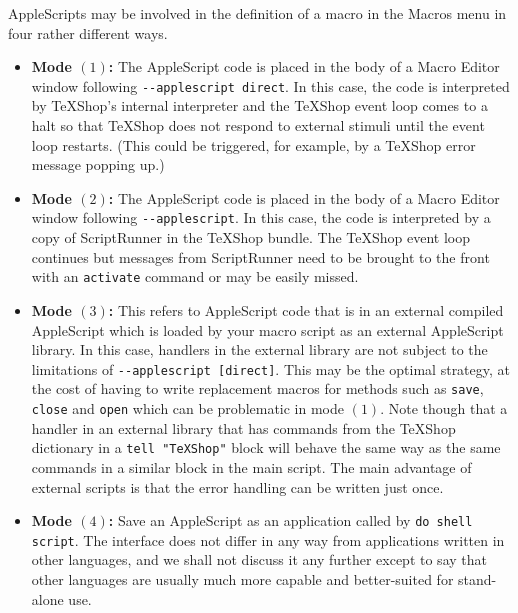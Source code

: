 \documentclass[11pt]{amsart}
\def\Macros{\textsf{Macros}\xspace}
\begin{document}
AppleScripts may be involved in the definition of a macro in the \Macros menu in four rather different ways.
\begin{itemize}
\item \textbf{Mode $(1)$:}
The AppleScript code is placed in the body of a Macro Editor window following  \verb|--applescript direct|. In this case, the code is interpreted by TeXShop's internal interpreter and the TeXShop event loop comes to a halt so that TeXShop does not respond to external stimuli until the event loop restarts. (This could be triggered, for example, by a TeXShop error message popping up.)
\item \textbf{Mode $(2)$:} The AppleScript code is placed in the body of a Macro Editor window following  \verb|--applescript|. In this case, the code is interpreted by a copy of ScriptRunner in the TeXShop bundle. The TeXShop event loop continues but messages from ScriptRunner need to be brought to the front with an {\tt activate} command or may be easily missed.
\item \textbf{Mode $(3)$:}
This refers to AppleScript code that is in an external compiled AppleScript which is loaded by your macro script as an external AppleScript library. In this case, handlers in the external library are not subject to the limitations of  {\tt-{}-applescript [direct]}. This may be the optimal strategy, at the cost of having to write replacement macros for methods such as  {\tt save}, {\tt close} and {\tt open} which can be problematic in mode $(1)$. Note though that a handler in an external library that has commands from the TeXShop dictionary in a {\tt tell "TeXShop"} block will behave the same way as the same commands in a similar block in the main script. The main advantage of external scripts is that the error handling can be written just once.
\item \textbf{Mode $(4)$:} Save an AppleScript as an application called by \verb|do shell script|.  The interface does not differ in any way from applications written in other languages, and we shall not discuss it any further except to say that other languages are usually much more capable and better-suited for stand-alone use.
\end{itemize}

\end{document}
